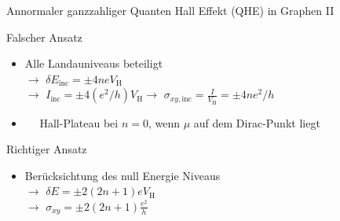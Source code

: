 \documentclass[../defence.tex]{subfiles}
\begin{document}
  \begin{frame}{Annormaler ganzzahliger Quanten Hall Effekt (QHE) in Graphen II}
        \begin{alertblock}{Falscher Ansatz}
          \begin{itemize}
            \item Alle Landauniveaus beteiligt\\
            \pause
            $\rightarrow$ $\delta E_\mathrm{inc}=\pm 4neV_\mathrm{H}$\\
            $\rightarrow$ $I_\mathrm{inc}=\pm 4(e^2/h)V_\mathrm{H}$\pause $\rightarrow$ $\sigma_ {xy,\mathrm{inc}}=\frac{I}{V_\mathrm{H}}=\pm 4ne^2 / h$
            \pause
            \item \faBolt$\quad$ Hall-Plateau bei $n=0$, wenn $\mu$ auf dem Dirac-Punkt liegt
          \end{itemize}
        \end{alertblock}
        \pause
        \begin{exampleblock}{Richtiger Ansatz}
          \begin{itemize}
            \item Berücksichtung des null Energie Niveaus\\
            \pause
            $\rightarrow$ $\delta E=\pm 2(2n+1)eV_\mathrm{H}$\\
            $\rightarrow$ $\sigma_{xy}=\pm 2(2n+1)\frac{e^2}{h}$
          \end{itemize}
        \end{exampleblock}
  \end{frame}
\end{document}
